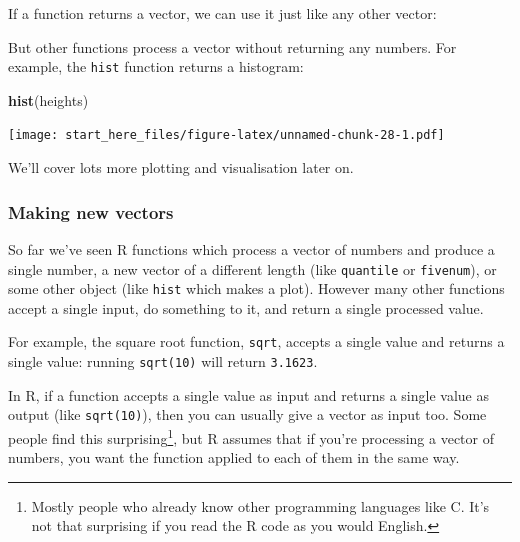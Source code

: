\documentclass[]{article}
\newenvironment{Shaded}{\begin{snugshade}}{\end{snugshade}}
\newcommand{\CommentTok}[1]{\textcolor[rgb]{0.56,0.35,0.01}{\textit{#1}}}
\newcommand{\DecValTok}[1]{\textcolor[rgb]{0.00,0.00,0.81}{#1}}
\newcommand{\KeywordTok}[1]{\textcolor[rgb]{0.13,0.29,0.53}{\textbf{#1}}}
\newcommand{\NormalTok}[1]{#1}
\newcommand{\StringTok}[1]{\textcolor[rgb]{0.31,0.60,0.02}{#1}}
\let\rmarkdownfootnote\footnote%
\def\footnote{\protect\rmarkdownfootnote}
\begin{document}
If a function returns a vector, we can use it just like any other vector:

\begin{Shaded}
\end{Shaded}

But other functions process a vector without returning any numbers. For example,
the \texttt{hist} function returns a histogram:

\begin{Shaded}
\begin{Highlighting}[]
\KeywordTok{hist}\NormalTok{(heights)}
\end{Highlighting}
\end{Shaded}

\texttt{[image: start\_here\_files/figure-latex/unnamed-chunk-28-1.pdf]}

We'll cover lots more plotting and visualisation later on.

\hypertarget{making-new-vectors}{%
\subsubsection*{Making new vectors}\label{making-new-vectors}}

So far we've seen R functions which process a vector of numbers and produce a
single number, a new vector of a different length (like \texttt{quantile} or
\texttt{fivenum}), or some other object (like \texttt{hist} which makes a plot). However many
other functions accept a single input, do something to it, and return a single
processed value.

For example, the square root function, \texttt{sqrt}, accepts a single value and
returns a single value: running \texttt{sqrt(10)} will return \texttt{3.1623}.

In R, if a function accepts a single value as input and returns a single value
as output (like \texttt{sqrt(10)}), then you can usually give a vector as input too.
Some people find this surprising\footnote{Mostly people who already know other
  programming languages like C. It's not that surprising if you read the R code as
  you would English.}, but R assumes that if you're processing a vector of
numbers, you want the function applied to each of them in the same way.
\end{document}
